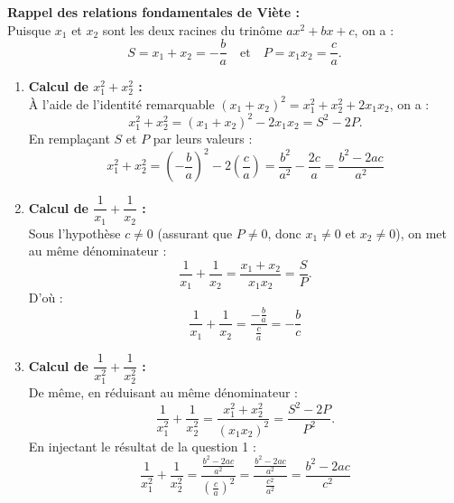 \documentclass[11pt,a4paper]{article}
\begin{document}
\begin{correctionbox}
\textbf{Rappel des relations fondamentales de Viète :}\\
Puisque $x_1$ et $x_2$ sont les deux racines du trinôme $ax^2 + bx + c$, on a :
\[
S = x_1 + x_2 = -\frac{b}{a} \quad \text{et} \quad P = x_1 x_2 = \frac{c}{a}.
\]

\begin{enumerate}
    \item \textbf{Calcul de $x_1^2 + x_2^2$ :}\\
    À l'aide de l'identité remarquable $(x_1 + x_2)^2 = x_1^2 + x_2^2 + 2x_1 x_2$, on a :
    \[
    x_1^2 + x_2^2 = (x_1 + x_2)^2 - 2x_1 x_2 = S^2 - 2P.
    \]
    En remplaçant $S$ et $P$ par leurs valeurs :
    \[
    x_1^2 + x_2^2 = \left(-\frac{b}{a}\right)^2 - 2\left(\frac{c}{a}\right) = \frac{b^2}{a^2} - \frac{2c}{a} = \boxed{\frac{b^2 - 2ac}{a^2}}
    \]

    \item \textbf{Calcul de $\dfrac{1}{x_1} + \dfrac{1}{x_2}$ :}\\
    Sous l'hypothèse $c \neq 0$ (assurant que $P \neq 0$, donc $x_1 \neq 0$ et $x_2 \neq 0$), on met au même dénominateur :
    \[
    \frac{1}{x_1} + \frac{1}{x_2} = \frac{x_1 + x_2}{x_1 x_2} = \frac{S}{P}.
    \]
    D'où :
    \[
    \frac{1}{x_1} + \frac{1}{x_2} = \frac{-\frac{b}{a}}{\frac{c}{a}} = \boxed{-\frac{b}{c}}
    \]

    \item \textbf{Calcul de $\dfrac{1}{x_1^2} + \dfrac{1}{x_2^2}$ :}\\
    De même, en réduisant au même dénominateur :
    \[
    \frac{1}{x_1^2} + \frac{1}{x_2^2} = \frac{x_1^2 + x_2^2}{(x_1 x_2)^2} = \frac{S^2 - 2P}{P^2}.
    \]
    En injectant le résultat de la question 1 :
    \[
    \frac{1}{x_1^2} + \frac{1}{x_2^2} = \frac{\frac{b^2 - 2ac}{a^2}}{\left(\frac{c}{a}\right)^2} = \frac{\frac{b^2 - 2ac}{a^2}}{\frac{c^2}{a^2}} = \boxed{\frac{b^2 - 2ac}{c^2}}
    \]


\end{enumerate}
\end{correctionbox}
\end{document}
